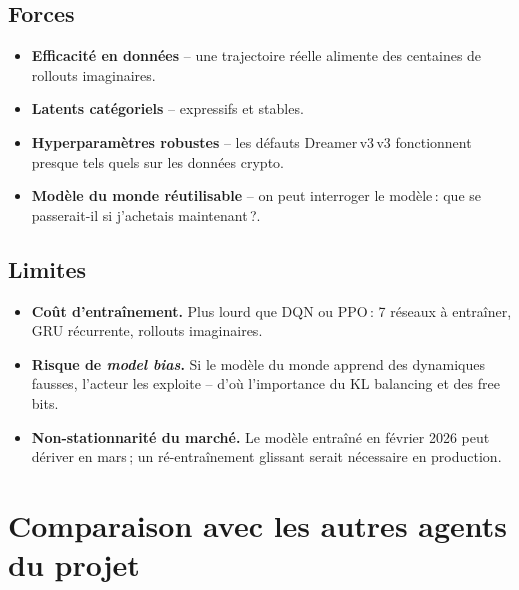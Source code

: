 \documentclass[11pt,a4paper]{article}
\newcommand{\dreamer}{Dreamer\,v3}
\newcommand{\bluebf}[1]{\textbf{\color{enseirbblue}#1}}
\begin{document}
\subsection{Forces}
\begin{itemize}
    \item \bluebf{Efficacité en données} -- une trajectoire réelle alimente
          des centaines de rollouts imaginaires.
    \item \bluebf{Latents catégoriels} -- expressifs et stables.
    \item \bluebf{Hyperparamètres robustes} -- les défauts \dreamer{}\,v3
          fonctionnent presque tels quels sur les données crypto.
    \item \bluebf{Modèle du monde réutilisable} -- on peut interroger le
          modèle\,: \og{}que se passerait-il si j'achetais maintenant\,?\fg.
\end{itemize}

\subsection{Limites}
\begin{itemize}
    \item \bluebf{Coût d'entraînement.} Plus lourd que DQN ou PPO\,: 7
          réseaux à entraîner, GRU récurrente, rollouts imaginaires.
    \item \bluebf{Risque de \emph{model bias}.} Si le modèle du monde
          apprend des dynamiques fausses, l'acteur les exploite -- d'où
          l'importance du KL balancing et des free bits.
    \item \bluebf{Non-stationnarité du marché.} Le modèle entraîné en
          février 2026 peut dériver en mars\,; un ré-entraînement
          glissant serait nécessaire en production.
\end{itemize}

\section{Comparaison avec les autres agents du projet}
\end{document}
